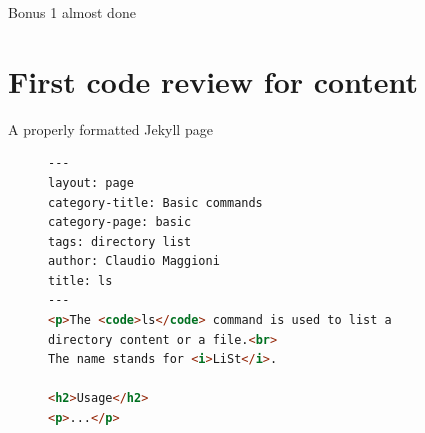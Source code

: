 \documentclass[10pt]{beamer}
\begin{document}
\begin{frame}[fragile]{Bonus 1 almost done}
\vfill{}\vfill
\end{frame}

\begin{frame}[standout]
\end{frame}

\section{First code review for content}

\begin{frame}[fragile]{A properly formatted Jekyll page}
\begin{figure}[h]
\begin{lstlisting}[language=html,basicstyle=\small\ttfamily]
---
layout: page
category-title: Basic commands
category-page: basic
tags: directory list
author: Claudio Maggioni
title: ls
---
<p>The <code>ls</code> command is used to list a
directory content or a file.<br>
The name stands for <i>LiSt</i>.

<h2>Usage</h2>
<p>...</p>
\end{lstlisting}
\end{figure}
\end{frame}

{
\begin{frame}
\end{frame}}
\end{document}

